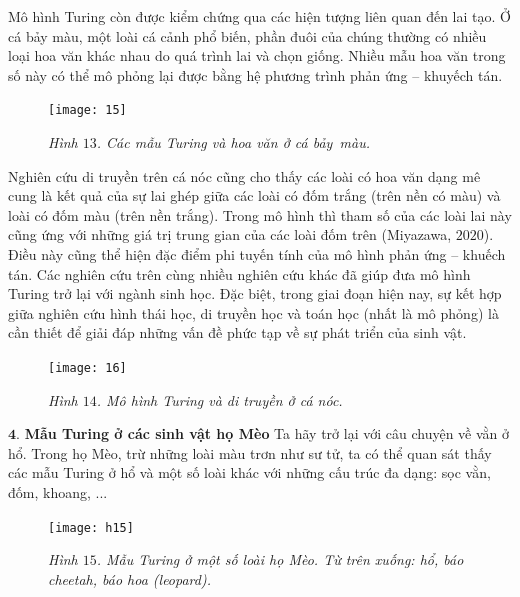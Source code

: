 \begin{multicols}{2}
	\vskip 0.05cm
	Mô hình Turing còn được kiểm chứng qua các hiện tượng liên quan đến lai tạo. Ở cá bảy màu, một loài cá cảnh phổ biến, phần đuôi của chúng thường có nhiều loại hoa văn khác nhau do quá trình lai và chọn giống. Nhiều mẫu hoa văn trong số này có thể mô phỏng lại được bằng hệ phương trình phản ứng -- khuyếch tán.
	\begin{figure}[H]
		\vspace*{-6pt}
		\centering
		\captionsetup{labelformat= empty, justification=centering}
		\texttt{[image: 15]}
		\caption{\small\textit{\color{timhieukhoahoc}Hình $13$. Các mẫu Turing và hoa văn ở cá bảy~màu.}}
		\vspace*{-12pt}
	\end{figure}
	Nghiên cứu di truyền trên cá nóc cũng cho thấy các loài có hoa văn dạng mê cung là kết quả của sự lai ghép giữa các loài có đốm trắng (trên nền có màu) và loài có đốm màu (trên nền trắng). Trong mô hình thì tham số của các loài lai này cũng ứng với những giá trị trung gian của các loài đốm trên (Miyazawa, $2020$). Điều này cũng thể hiện đặc điểm phi tuyến tính của mô hình phản ứng -- khuếch tán.
	\vskip 0.05cm
	Các nghiên cứu trên cùng nhiều nghiên cứu khác đã giúp đưa mô hình Turing trở lại với ngành sinh học. Đặc biệt, trong giai đoạn hiện nay, sự kết hợp giữa nghiên cứu hình thái học, di truyền học và toán học (nhất là mô phỏng) là cần thiết để giải đáp những vấn đề phức tạp về sự phát triển của sinh vật.
	\begin{figure}[H]
		\vspace*{5pt}
		\centering
		\captionsetup{labelformat= empty, justification=centering}
		\texttt{[image: 16]}
		\caption{\small\textit{\color{timhieukhoahoc}Hình $14$. Mô hình Turing và di truyền ở cá nóc.}}
		\vspace*{-10pt}
	\end{figure}
	$\pmb{4.}$ \textbf{\color{timhieukhoahoc}Mẫu Turing ở các sinh vật họ Mèo}
	\vskip 0.05cm
	Ta hãy trở lại với câu chuyện về vằn ở hổ. Trong họ Mèo, trừ những loài màu trơn như sư tử, ta có thể quan sát thấy các mẫu Turing ở hổ và một số loài khác với những cấu trúc đa dạng: sọc vằn, đốm, khoang, ... 
	\begin{figure}[H]
		\vspace*{-5pt}
		\centering
		\captionsetup{labelformat= empty, justification=centering}
		\texttt{[image: h15]}
		\caption{\small\textit{\color{timhieukhoahoc}Hình $15$. Mẫu Turing ở một số loài họ Mèo. Từ trên xuống: hổ, báo cheetah, báo hoa (leopard).}}
		\vspace*{-3pt}

\end{figure}
\end{multicols}
